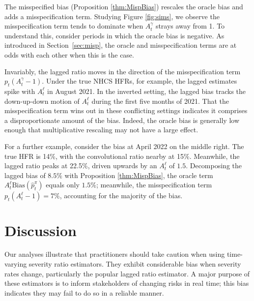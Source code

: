 \documentclass{article}
\renewcommand{\hat}{\widehat} %
\begin{document}
The misspecified bias (Proposition \ref{thm:MispBias}) rescales the oracle bias and adds a misspecification term. Studying Figure \ref{fig:sims}, we observe the misspecification term tends to dominate when $A_t^\gamma$ strays away from 1. To understand this, consider periods in which the oracle bias is negative. As introduced in Section~\ref{sec:misp}, the oracle and misspecification terms are at odds with each other when this is the case. 

Invariably, the lagged ratio moves in the direction of the misspecification term $p_t(A_t^\gamma-1)$. Under the true NHCS HFRs, for example, the lagged estimates spike with $A_t^\ell$ in August 2021. In the inverted setting, the lagged bias tracks the down-up-down motion of $A_t^\ell$ during the first five months of 2021. That the misspecification term wins out in these conflicting settings indicates it comprises a disproportionate amount of the bias. Indeed, the oracle bias is generally low enough that multiplicative rescaling may not have a large effect.

For a further example, consider the bias at April 2022 on the middle right. The true HFR is 14\%, with the convolutional ratio nearby at 15\%. Meanwhile, the lagged ratio peaks at 22.5\%, driven upwards by an $A_t^\ell$ of $1.5$. Decomposing the lagged bias of $8.5\%$ with Proposition \ref{thm:MispBias}, the oracle term $A_t^\ell \text{Bias}(\hat{p}_t^\pi)$ equals only $1.5\%$; meanwhile, the misspecification term $p_t(A_t^\ell-1) = 7\%$, accounting for the majority of the bias. 

\section{Discussion}

Our analyses illustrate that practitioners should take caution when using
time-varying severity ratio estimators. They exhibit considerable bias when severity rates
change, particularly the popular lagged ratio estimator. A major purpose of these
estimators is to inform stakeholders of changing risks in real time; this bias
indicates they may fail to do so in a reliable manner.
\end{document}
